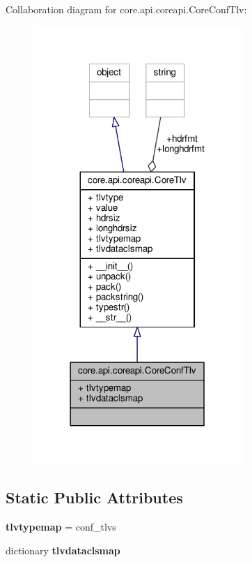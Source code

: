 Collaboration diagram for core.\+api.\+coreapi.\+Core\+Conf\+Tlv\+:
\nopagebreak
\begin{figure}[H]
\begin{center}
\leavevmode
\includegraphics[width=225pt]{classcore_1_1api_1_1coreapi_1_1_core_conf_tlv__coll__graph}
\end{center}
\end{figure}
\subsection*{Static Public Attributes}
\begin{DoxyCompactItemize}
\item 
\hypertarget{classcore_1_1api_1_1coreapi_1_1_core_conf_tlv_a83a80cccd88b2cc074d6fda5147c5640}{{\bfseries tlvtypemap} = conf\+\_\+tlvs}\label{classcore_1_1api_1_1coreapi_1_1_core_conf_tlv_a83a80cccd88b2cc074d6fda5147c5640}

\item 
dictionary {\bfseries tlvdataclsmap}
\end{DoxyCompactItemize}
